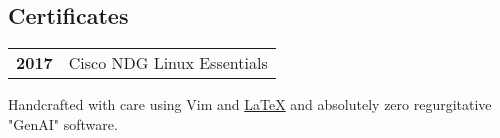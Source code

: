 \documentclass[lighthipster]{simplehipstercv}
\newlength{\rightcolwidth}
\begin{document}
\begin{paracol}{2}
\section*{Certificates}
\begin{tabular}{>{\footnotesize\bfseries}r >{\footnotesize}p{}}
    2017 & Cisco NDG Linux Essentials
\end{tabular}
\bigskip




\vfill{} %
\vspace{4em}
\setlength{\parindent}{0pt}
\begin{minipage}[t]{\rightcolwidth}
\vfill
\begin{center}\fontfamily{\sfdefault}\selectfont \color{black!70}
{
  \small{Handcrafted with care using Vim and \href{https://github.com/izcet/latex-resume}{\LaTeX{}} and absolutely zero regurgitative "GenAI" software.}
}
\end{center}
\end{minipage}

\vspace{48em}
\end{paracol}
\end{document}
